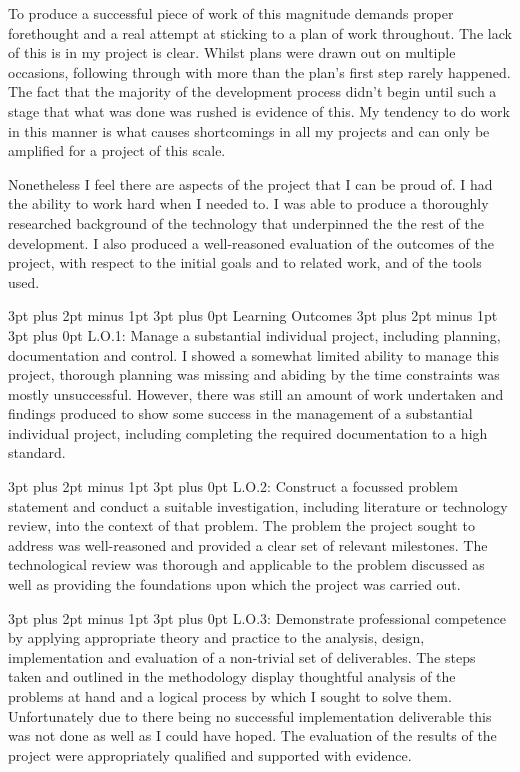 \documentclass[12pt,a4paper,oneside]{article}
\makeatletter
\renewcommand\paragraph{\@startsection {paragraph}{1}{0mm} %
	                           {3pt plus 2pt minus 1pt} %
	                           {3pt plus 0pt} %
	                           {\normalfont}}
\renewcommand\subsubsection{\@startsection {subsubsection}{1}{0mm} %
	                           {3pt plus 2pt minus 1pt} %
	                           {3pt plus 0pt} %
	                           {\normalfont\bfseries}}
\makeatother
\begin{document}
To produce a successful piece of work of this magnitude demands proper forethought and a real attempt at sticking to a plan of work throughout. The lack of this is in my project is clear. Whilst plans were drawn out on multiple occasions, following through with more than the plan's first step rarely happened. The fact that the majority of the development process didn't begin until such a stage that what was done was rushed is evidence of this. My tendency to do work in this manner is what causes shortcomings in all my projects and can  only be amplified for a project of this scale.

Nonetheless I feel there are aspects of the project that I can be proud of. I had the ability to work hard when I needed to. I was able to produce a thoroughly researched background of the technology that underpinned the the rest of the development. I also produced a well-reasoned evaluation of the outcomes of the project, with respect to the initial goals and to related work, and of the tools used. 

\subsubsection{Learning Outcomes}
\paragraph{L.O.1: Manage a substantial individual project, including planning, documentation and control.}
I showed a somewhat limited ability to manage this project, thorough planning was missing and abiding by the time constraints was mostly unsuccessful. However, there was still an amount of work undertaken and findings produced to show some success in the management of a substantial individual project, including completing the required documentation to a high standard.

\paragraph{L.O.2: Construct a focussed problem statement and conduct a suitable investigation, including literature or technology review, into the context of that problem.}
The problem the project sought to address was well-reasoned and provided a clear set of relevant milestones. The technological review was thorough and applicable to the problem discussed as well as providing the foundations upon which the project was carried out.

\paragraph{L.O.3: Demonstrate professional competence by applying appropriate theory and practice to the analysis, design, implementation and evaluation of a non-trivial set of deliverables.}
The steps taken and outlined in the methodology display thoughtful analysis of the problems at hand and a logical process by which I sought to solve them. Unfortunately due to there being no successful implementation deliverable this was not done as well as I could have hoped. The evaluation of the results of the project were appropriately qualified and supported with evidence.
\end{document}
